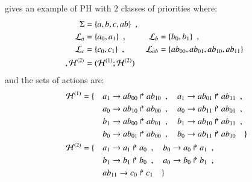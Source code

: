 \begin{example}
   gives an example of PH with $2$ classes of priorities where:
  \begin{align*}
    \Sigma &= \{ a, b, c, ab \} \enspace, \\
    \mathcal{L}_a &= \{ a_0, a_1 \} \enspace, & \mathcal{L}_b &= \{ b_0, b_1 \} \enspace, \\
    \mathcal{L}_c &= \{ c_0, c_1 \} \enspace, & \mathcal{L}_{ab} &= \{ ab_{00}, ab_{01}, ab_{10}, ab_{11} \} \\ \enspace,
    \mathcal{H}^{\langle 2 \rangle} &= (\mathcal{H}^{(1)}; \mathcal{H}^{(2)})
  \end{align*}
  and the sets of actions are:
  \begin{align*}
    \mathcal{H}^{(1)} = \{ \quad
      & a_1\rightarrow ab_{00}\Rsh ab_{10} \enspace , \quad
      a_1\rightarrow ab_{01}\Rsh ab_{11} \enspace , \\
      & a_0\rightarrow ab_{10}\Rsh ab_{00} \enspace , \quad
      a_0\rightarrow ab_{11}\Rsh ab_{01} \enspace , \\
      & b_1\rightarrow ab_{00}\Rsh ab_{01} \enspace , \quad
      b_1\rightarrow ab_{10}\Rsh ab_{11} \enspace , \\
      & b_0\rightarrow ab_{01}\Rsh ab_{00} \enspace , \quad
      b_0\rightarrow ab_{11}\Rsh ab_{10}
    \quad \} \\
    \mathcal{H}^{(2)} = \{ \quad
      & a_1\rightarrow a_1\Rsh a_0 \enspace , \quad
      b_0\rightarrow a_0\Rsh a_1 \enspace , \\
      & b_1\rightarrow b_1\Rsh b_0 \enspace , \quad
      a_0\rightarrow b_0\Rsh b_1 \enspace , \\
      & ab_{11}\rightarrow c_0\Rsh c_1
    \quad \} \\
  \end{align*}

\begin{figure}[tb]
  \centering
\end{figure}
\end{example}
